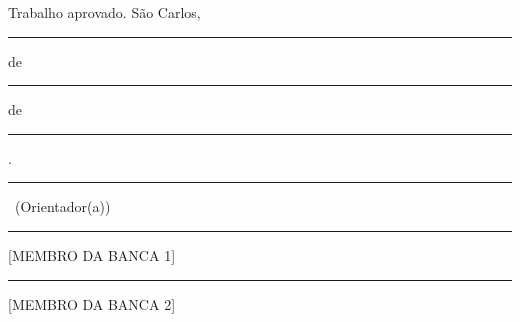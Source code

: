 \documentclass[12pt,openright,twoside,a4paper,english,brazil]{abntex2}
\begin{document}
\begin{folhadeaprovacao}
\begin{center}
{\ABNTEXchapterfont\large\imprimirautor}

\vspace*{\fill}\vspace*{1.2cm}
\begin{minipage}[t]{\textwidth}
\centering
\ABNTEXchapterfont\bfseries\large\imprimirtitulo
\end{minipage}
\vspace*{1.2cm}

\hspace{.45\textwidth}
\begin{minipage}{.5\textwidth}
\imprimirpreambulo
\end{minipage}
\vspace*{1.2cm}

\end{center}

Trabalho aprovado. São Carlos, \rule[-0.2cm]{2.5cm}{0.15mm} de
\rule[-0.2cm]{4cm}{0.15mm} de \rule[-0.2cm]{1.5cm}{0.15mm}.

\vspace{1.0cm}
\begin{center}
\rule{9cm}{0.15mm}\par
\imprimirorientador\ (Orientador(a))

\vspace{1.0cm}
\rule{9cm}{0.15mm}\par
{}[MEMBRO DA BANCA 1]

\vspace{1.0cm}
\rule{9cm}{0.15mm}\par
{}[MEMBRO DA BANCA 2]
\end{center}
\vspace*{\fill}
\end{folhadeaprovacao}
\end{document}
